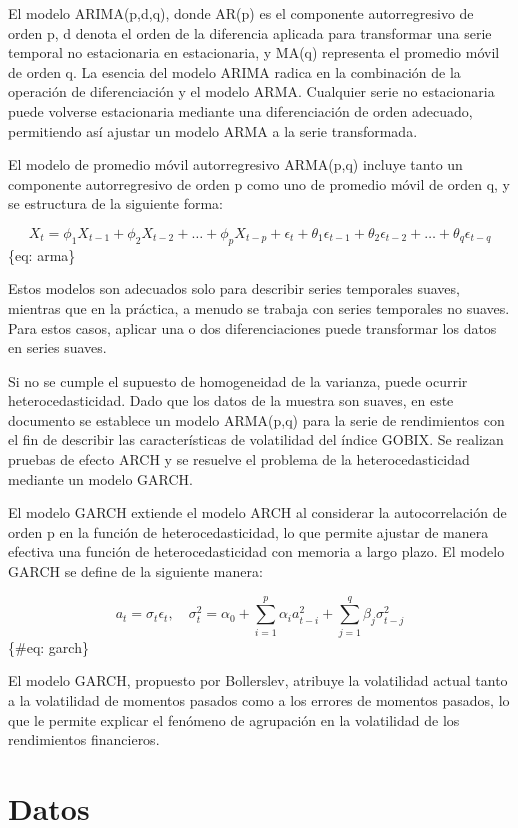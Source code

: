 \documentclass[
  number,
  preprint,
  3p,
  onecolumn]{elsarticle}
\begin{document}
El modelo ARIMA(p,d,q), donde AR(p) es el componente autorregresivo de
orden p, d denota el orden de la diferencia aplicada para transformar
una serie temporal no estacionaria en estacionaria, y MA(q) representa
el promedio móvil de orden q. La esencia del modelo ARIMA radica en la
combinación de la operación de diferenciación y el modelo ARMA.
Cualquier serie no estacionaria puede volverse estacionaria mediante una
diferenciación de orden adecuado, permitiendo así ajustar un modelo ARMA
a la serie transformada.

El modelo de promedio móvil autorregresivo ARMA(p,q) incluye tanto un
componente autorregresivo de orden p como uno de promedio móvil de orden
q, y se estructura de la siguiente forma:

\[
X_t = \phi_1 X_{t-1} + \phi_2 X_{t-2} + \dots + \phi_p X_{t-p} + \epsilon_t + \theta_1 \epsilon_{t-1} + \theta_2 \epsilon_{t-2} + \dots + \theta_q \epsilon_{t-q}
\] \{eq: arma\}

Estos modelos son adecuados solo para describir series temporales
suaves, mientras que en la práctica, a menudo se trabaja con series
temporales no suaves. Para estos casos, aplicar una o dos
diferenciaciones puede transformar los datos en series suaves.

Si no se cumple el supuesto de homogeneidad de la varianza, puede
ocurrir heterocedasticidad. Dado que los datos de la muestra son suaves,
en este documento se establece un modelo ARMA(p,q) para la serie de
rendimientos con el fin de describir las características de volatilidad
del índice GOBIX. Se realizan pruebas de efecto ARCH y se resuelve el
problema de la heterocedasticidad mediante un modelo GARCH.

El modelo GARCH extiende el modelo ARCH al considerar la autocorrelación
de orden p en la función de heterocedasticidad, lo que permite ajustar
de manera efectiva una función de heterocedasticidad con memoria a largo
plazo. El modelo GARCH se define de la siguiente manera:

\[
a_t = \sigma_t \epsilon_t, \quad \sigma_t^2 = \alpha_0 + \sum_{i=1}^{p} \alpha_i a_{t-i}^2 + \sum_{j=1}^{q} \beta_j \sigma_{t-j}^2
\] \{\#eq: garch\}

El modelo GARCH, propuesto por Bollerslev, atribuye la volatilidad
actual tanto a la volatilidad de momentos pasados como a los errores de
momentos pasados, lo que le permite explicar el fenómeno de agrupación
en la volatilidad de los rendimientos financieros.

\section{Datos}\label{datos}
\end{document}
